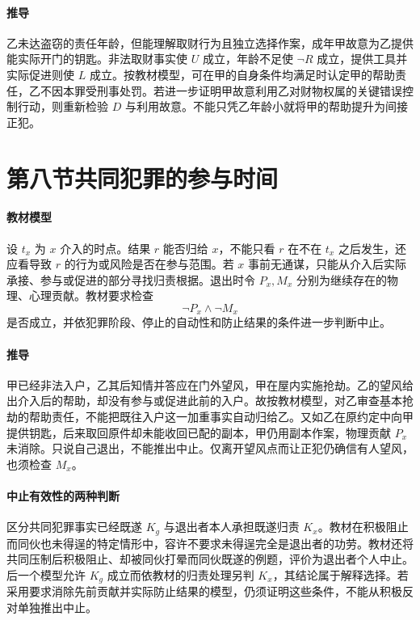\paragraph{推导}
乙未达盗窃的责任年龄，但能理解取财行为且独立选择作案，成年甲故意为乙提供能实际开门的钥匙。非法取财事实使 \(U\) 成立，年龄不足使 \(\neg R\) 成立，提供工具并实际促进则使 \(L\) 成立。按教材模型，可在甲的自身条件均满足时认定甲的帮助责任，乙不因本罪受刑事处罚。若进一步证明甲故意利用乙对财物权属的关键错误控制行动，则重新检验 \(D\) 与利用故意。不能只凭乙年龄小就将甲的帮助提升为间接正犯。

\section{第八节\quad 共同犯罪的参与时间}

\paragraph{教材模型}
设 \(t_x\) 为 \(x\) 介入的时点。结果 \(r\) 能否归给 \(x\)，不能只看 \(r\) 在不在 \(t_x\) 之后发生，还应看导致 \(r\) 的行为或风险是否在参与范围。若 \(x\) 事前无通谋，只能从介入后实际承接、参与或促进的部分寻找归责根据。退出时令 \(P_x,M_x\) 分别为继续存在的物理、心理贡献。教材要求检查
\[
\neg P_x\land\neg M_x
\]
是否成立，并依犯罪阶段、停止的自动性和防止结果的条件进一步判断中止。

\paragraph{推导}
甲已经非法入户，乙其后知情并答应在门外望风，甲在屋内实施抢劫。乙的望风给出介入后的帮助，却没有参与或促进此前的入户。故按教材模型，对乙审查基本抢劫的帮助责任，不能把既往入户这一加重事实自动归给乙。又如乙在原约定中向甲提供钥匙，后来取回原件却未能收回已配的副本，甲仍用副本作案，物理贡献 \(P_x\) 未消除。只说自己退出，不能推出中止。仅离开望风点而让正犯仍确信有人望风，也须检查 \(M_x\)。

\paragraph{中止有效性的两种判断}
区分共同犯罪事实已经既遂 \(K_g\) 与退出者本人承担既遂归责 \(K_x\)。教材在积极阻止而同伙也未得逞的特定情形中，容许不要求未得逞完全是退出者的功劳。教材还将共同压制后积极阻止、却被同伙打晕而同伙既遂的例题，评价为退出者个人中止。后一个模型允许 \(K_g\) 成立而依教材的归责处理另判 \(K_x\)，其结论属于解释选择。若采用要求消除先前贡献并实际防止结果的模型，仍须证明这些条件，不能从积极反对单独推出中止。

